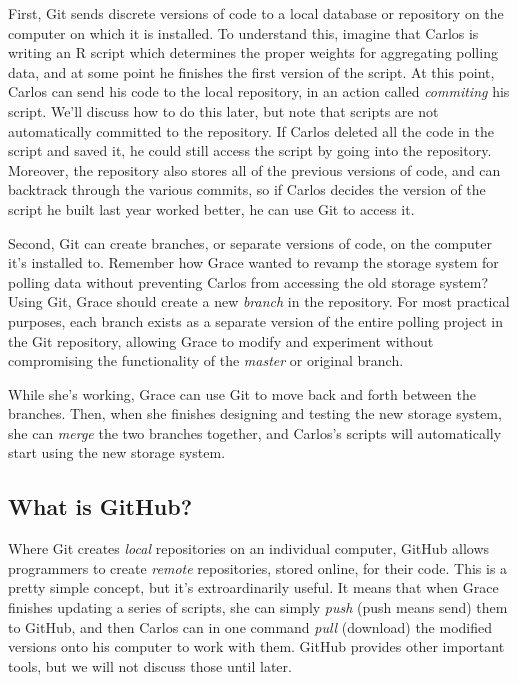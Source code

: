 \documentclass[
]{book}
\begin{document}
First, Git sends discrete versions of code to a local database or repository on the computer on which it is installed. To understand this, imagine that Carlos is writing an R script which determines the proper weights for aggregating polling data, and at some point he finishes the first version of the script. At this point, Carlos can send his code to the local repository, in an action called \emph{commiting} his script. We'll discuss how to do this later, but note that scripts are not automatically committed to the repository. If Carlos deleted all the code in the script and saved it, he could still access the script by going into the repository. Moreover, the repository also stores all of the previous versions of code, and can backtrack through the various commits, so if Carlos decides the version of the script he built last year worked better, he can use Git to access it.

Second, Git can create branches, or separate versions of code, on the computer it's installed to. Remember how Grace wanted to revamp the storage system for polling data without preventing Carlos from accessing the old storage system? Using Git, Grace should create a new \emph{branch} in the repository. For most practical purposes, each branch exists as a separate version of the entire polling project in the Git repository, allowing Grace to modify and experiment without compromising the functionality of the \emph{master} or original branch.

While she's working, Grace can use Git to move back and forth between the branches. Then, when she finishes designing and testing the new storage system, she can \emph{merge} the two branches together, and Carlos's scripts will automatically start using the new storage system.

\hypertarget{what-is-github}{%
\subsection{What is GitHub?}\label{what-is-github}}

Where Git creates \emph{local} repositories on an individual computer, GitHub allows programmers to create \emph{remote} repositories, stored online, for their code. This is a pretty simple concept, but it's extroardinarily useful. It means that when Grace finishes updating a series of scripts, she can simply \emph{push} (push means send) them to GitHub, and then Carlos can in one command \emph{pull} (download) the modified versions onto his computer to work with them. GitHub provides other important tools, but we will not discuss those until later.
\end{document}

